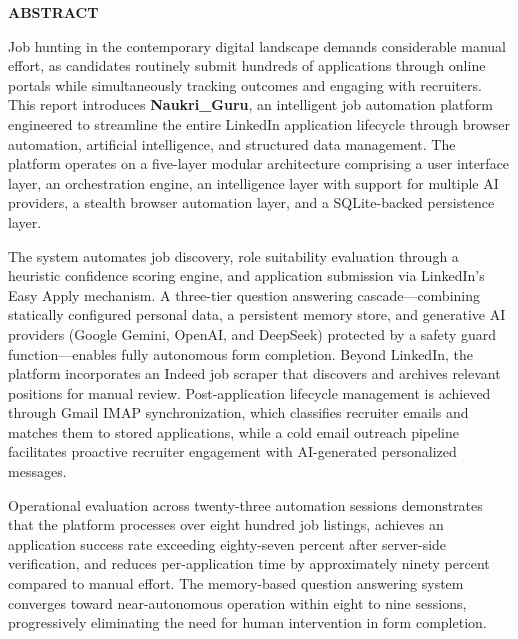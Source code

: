 \documentclass[12pt, a4paper, oneside]{report}
\newcommand{\frontmatterheading}[1]{%
  \begin{center}\Large\bfseries #1\end{center}
  \vspace{0.5cm}
}
\begin{document}
\clearpage
\thispagestyle{plain}
\frontmatterheading{ABSTRACT}

Job hunting in the contemporary digital landscape demands considerable manual effort, as candidates routinely submit hundreds of applications through online portals while simultaneously tracking outcomes and engaging with recruiters. This report introduces \textbf{Naukri\_Guru}, an intelligent job automation platform engineered to streamline the entire LinkedIn application lifecycle through browser automation, artificial intelligence, and structured data management. The platform operates on a five-layer modular architecture comprising a user interface layer, an orchestration engine, an intelligence layer with support for multiple AI providers, a stealth browser automation layer, and a SQLite-backed persistence layer.

The system automates job discovery, role suitability evaluation through a heuristic confidence scoring engine, and application submission via LinkedIn's Easy Apply mechanism. A three-tier question answering cascade---combining statically configured personal data, a persistent memory store, and generative AI providers (Google Gemini, OpenAI, and DeepSeek) protected by a safety guard function---enables fully autonomous form completion. Beyond LinkedIn, the platform incorporates an Indeed job scraper that discovers and archives relevant positions for manual review. Post-application lifecycle management is achieved through Gmail IMAP synchronization, which classifies recruiter emails and matches them to stored applications, while a cold email outreach pipeline facilitates proactive recruiter engagement with AI-generated personalized messages.

Operational evaluation across twenty-three automation sessions demonstrates that the platform processes over eight hundred job listings, achieves an application success rate exceeding eighty-seven percent after server-side verification, and reduces per-application time by approximately ninety percent compared to manual effort. The memory-based question answering system converges toward near-autonomous operation within eight to nine sessions, progressively eliminating the need for human intervention in form completion.

\clearpage
\tableofcontents
\listoffigures
{}
\listoftables
{}
\end{document}

